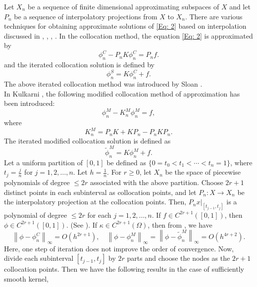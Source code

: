 \documentclass[sn-mathphys-num]{sn-jnl}%
\theoremstyle{thmstyleone}%
\theoremstyle{thmstyletwo}%
\theoremstyle{thmstylethree}%
\newcommand{\norm}[1]{\left\lVert #1\right\rVert}
\begin{document}
Let $X_n$ be a sequence of finite dimensional approximating subspaces of $X$ and let $P_n$ be a sequence of interpolatory projections from $X$ to $X_n$. There are various techniques for obtaining approximate solutions of \eqref{Eq: 2} based on interpolation discussed in \cite{KEA0}, \cite{Cha1}, \cite{RPK1}, \cite{Qun}. In the collocation method, the equation \eqref{Eq: 2} is approximated by
\begin{equation*} 
	\phi_{n}^C - P_nK\phi_{n}^C = P_nf.
\end{equation*}
and the iterated collocation solution is defined by
\begin{equation*} 
	\phi_{n}^S = K\phi_{n}^C + f.
\end{equation*}
The above iterated collocation method was introduced by Sloan \cite{Sl1}.\\
In Kulkarni \cite{RPK1}, the following modified collocation method of approximation has been introduced:
\begin{equation*} 
	\phi_{n}^M - K_{n}^M\phi_{n}^M = f,
\end{equation*}
where
\[	K_n^M = P_nK + KP_n - P_nKP_n.\]
The iterated modified collocation solution is defined as
\begin{equation*} 
	\tilde{\phi}_n^M=K\phi_n^M+f. 
\end{equation*} 
Let a uniform partition of $[0,1]$ be defined as $\{0 = t_0 < t_1 < \cdots < t_n = 1\}$, where $t_j = \frac{j}{n}$ for $j = 1,2, \ldots, n$. Let $h = \frac{1}{n}$. For $r \geq 0$, let $X_n$ be the space of piecewise polynomials of degree $ \le 2r$ associated with the above partition.
Choose $2r +1$ distinct points in each subinterval as collocation points, and let $P_n: X \rightarrow X_n$ be the interpolatory projection at the collocation points. Then, $P_nx|_{[t_{j-1}, t_j]}$ is a polynomial of degree $\leq 2r$ for each $j = 1, 2, \ldots, n$. 
If $f \in C^{2r +1}([0, 1])$, then $\phi \in C^{2r +1}([0, 1])$. (See \cite{Cha-Leb1}). If $\kappa \in C^{2r+1}(\Omega)$, then from \cite[Theorem 3.1]{RPK1}, we have
\begin{equation*} 
	\norm{\phi - \phi_{n}^C}_\infty = O\left(h^{2r +1}\right), \quad \norm{\phi - \phi_{n}^M}_\infty = \norm{\phi - \tilde{\phi}_n^M}_\infty = O\left(h^{4r + 2}\right).
\end{equation*}
Here, one step of iteration does not improve the order of convergence. Now, divide each subinterval $[t_{j-1}, t_j]$ by $2r$ parts and choose the nodes as the $2r+1$ collocation points. Then we have the following results in the case of sufficiently smooth kernel,
\end{document}
